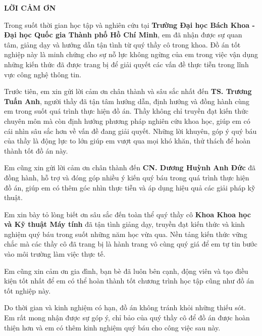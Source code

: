 \thispagestyle{empty} %
{}

\noindent
\vspace{0.2cm}
\begin{center}
    \textbf{\LARGE LỜI CẢM ƠN}
\end{center}
\vspace{1cm} %


Trong suốt thời gian học tập và nghiên cứu tại \textbf{Trường Đại học Bách Khoa - Đại học Quốc gia Thành phố Hồ Chí Minh}, em đã nhận được sự quan tâm, giảng dạy và hướng dẫn tận tình từ quý thầy cô trong khoa. Đồ án tốt nghiệp này là minh chứng cho sự nỗ lực không ngừng của em trong việc vận dụng những kiến thức đã được trang bị để giải quyết các vấn đề thực tiễn trong lĩnh vực công nghệ thông tin.

Trước tiên, em xin gửi lời cảm ơn chân thành và sâu sắc nhất đến \textbf{TS. Trương Tuấn Anh}, người thầy đã tận tâm hướng dẫn, định hướng và đồng hành cùng em trong suốt quá trình thực hiện đồ án. Thầy không chỉ truyền đạt kiến thức chuyên môn mà còn định hướng phương pháp nghiên cứu khoa học, giúp em có cái nhìn sâu sắc hơn về vấn đề đang giải quyết. Những lời khuyên, góp ý quý báu của thầy là động lực to lớn giúp em vượt qua mọi khó khăn, thử thách để hoàn thành tốt đồ án này.

Em cũng xin gửi lời cảm ơn chân thành đến \textbf{CN. Dương Huỳnh Anh Đức} đã đồng hành, hỗ trợ và đóng góp nhiều ý kiến quý báu trong quá trình thực hiện đồ án, giúp em có thêm góc nhìn thực tiễn và áp dụng hiệu quả các giải pháp kỹ thuật.

Em xin bày tỏ lòng biết ơn sâu sắc đến toàn thể quý thầy cô \textbf{Khoa Khoa học và Kỹ thuật Máy tính} đã tận tình giảng dạy, truyền đạt kiến thức và kinh nghiệm quý báu trong suốt những năm học vừa qua. Nền tảng kiến thức vững chắc mà các thầy cô đã trang bị là hành trang vô cùng quý giá để em tự tin bước vào môi trường làm việc thực tế.

Em cũng xin cảm ơn gia đình, bạn bè đã luôn bên cạnh, động viên và tạo điều kiện tốt nhất để em có thể hoàn thành tốt chương trình học tập cũng như đồ án tốt nghiệp này.

Do thời gian và kinh nghiệm có hạn, đồ án không tránh khỏi những thiếu sót. Em rất mong nhận được sự góp ý, chỉ bảo của quý thầy cô để đồ án được hoàn thiện hơn và em có thêm kinh nghiệm quý báu cho công việc sau này.

